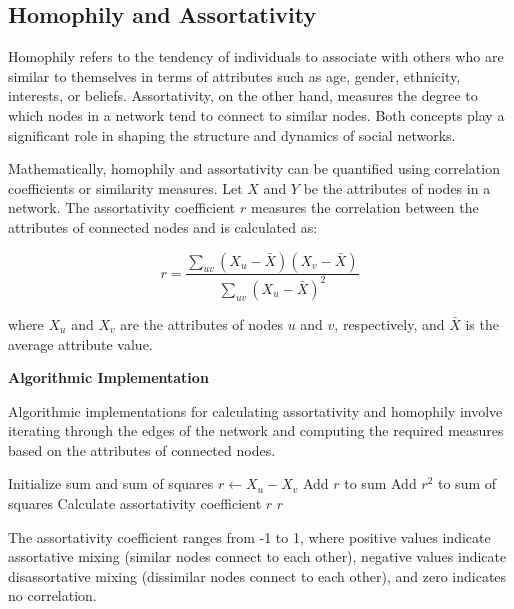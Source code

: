 \documentclass[12pt]{book} %
\begin{document}
\subsection{Homophily and Assortativity}

Homophily refers to the tendency of individuals to associate with others who are similar to themselves in terms of attributes such as age, gender, ethnicity, interests, or beliefs. Assortativity, on the other hand, measures the degree to which nodes in a network tend to connect to similar nodes. Both concepts play a significant role in shaping the structure and dynamics of social networks.

Mathematically, homophily and assortativity can be quantified using correlation coefficients or similarity measures. Let \(X\) and \(Y\) be the attributes of nodes in a network. The assortativity coefficient \(r\) measures the correlation between the attributes of connected nodes and is calculated as:

\[ r = \frac{\sum_{uv} (X_u - \bar{X})(X_v - \bar{X})}{\sum_{uv} (X_u - \bar{X})^2} \]

where \(X_u\) and \(X_v\) are the attributes of nodes \(u\) and \(v\), respectively, and \(\bar{X}\) is the average attribute value.

\textbf{Algorithmic Implementation}

Algorithmic implementations for calculating assortativity and homophily involve iterating through the edges of the network and computing the required measures based on the attributes of connected nodes.

\begin{algorithm}[H]
\caption{Assortativity Calculation}\label{alg:assortativity}
\begin{algorithmic}[1]
    \State Initialize sum and sum of squares
        \State $r \gets X_u - X_v$
        \State Add $r$ to sum
        \State Add $r^2$ to sum of squares
    \EndFor
    \State Calculate assortativity coefficient $r$
    \State \Return $r$
\EndFunction
\end{algorithmic}
\end{algorithm}
\FloatBarrier

The assortativity coefficient ranges from -1 to 1, where positive values indicate assortative mixing (similar nodes connect to each other), negative values indicate disassortative mixing (dissimilar nodes connect to each other), and zero indicates no correlation.
\end{document}
